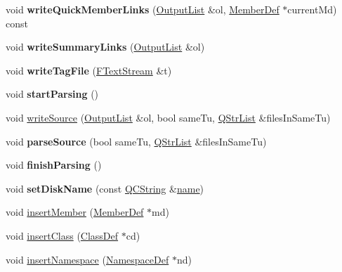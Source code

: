\begin{DoxyCompactItemize}
void {\bfseries write\+Quick\+Member\+Links} (\mbox{\hyperlink{class_output_list}{Output\+List}} \&ol, \mbox{\hyperlink{class_member_def}{Member\+Def}} $\ast$current\+Md) const
\item 
\mbox{\label{class_file_def_a077e73e869533220c7a94276c40359ef}} 
void {\bfseries write\+Summary\+Links} (\mbox{\hyperlink{class_output_list}{Output\+List}} \&ol)
\item 
\mbox{\label{class_file_def_a9107fa6f9cbf264e8632e235892278ae}} 
void {\bfseries write\+Tag\+File} (\mbox{\hyperlink{class_f_text_stream}{F\+Text\+Stream}} \&t)
\item 
\mbox{\label{class_file_def_a378a97570f1ac9a9795ec5700ab4ed97}} 
void {\bfseries start\+Parsing} ()
\item 
void \mbox{\hyperlink{class_file_def_a5ed9987b075539aa61654cc55d3bac28}{write\+Source}} (\mbox{\hyperlink{class_output_list}{Output\+List}} \&ol, bool same\+Tu, \mbox{\hyperlink{class_q_str_list}{Q\+Str\+List}} \&files\+In\+Same\+Tu)
\item 
\mbox{\label{class_file_def_a05dd5f93ab3877d299b22727a454199e}} 
void {\bfseries parse\+Source} (bool same\+Tu, \mbox{\hyperlink{class_q_str_list}{Q\+Str\+List}} \&files\+In\+Same\+Tu)
\item 
\mbox{\label{class_file_def_a1b008bcc891525a7b00888511f89101a}} 
void {\bfseries finish\+Parsing} ()
\item 
\mbox{\label{class_file_def_aa6f13f8956f0f9b71c0641b75f16a91a}} 
void {\bfseries set\+Disk\+Name} (const \mbox{\hyperlink{class_q_c_string}{Q\+C\+String}} \&\mbox{\hyperlink{class_file_def_a68f9ae783659b8c3738623edfdb6ee74}{name}})
\item 
void \mbox{\hyperlink{class_file_def_a84f7bb05a4a830056b208d94c6c2bd59}{insert\+Member}} (\mbox{\hyperlink{class_member_def}{Member\+Def}} $\ast$md)
\item 
void \mbox{\hyperlink{class_file_def_a61ec1208cd1055a3d91cb6a2ee60451d}{insert\+Class}} (\mbox{\hyperlink{class_class_def}{Class\+Def}} $\ast$cd)
\item 
void \mbox{\hyperlink{class_file_def_a579c95408a34b048fc3cd288bfa8893c}{insert\+Namespace}} (\mbox{\hyperlink{class_namespace_def}{Namespace\+Def}} $\ast$nd)

\end{DoxyCompactItemize}
